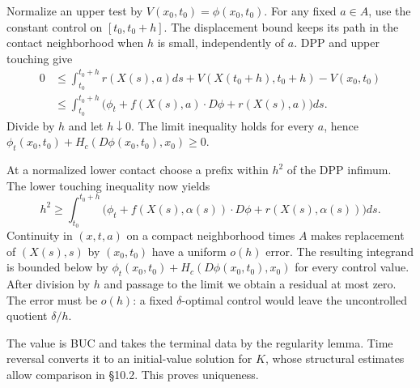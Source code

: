 \begin{expandedproof}
Normalize an upper test by $V(x_0,t_0)=\phi(x_0,t_0)$.
For any fixed $a\in A$, use the constant control on $[t_0,t_0+h]$.
The displacement bound keeps its path in the contact neighborhood when
$h$ is small, independently of $a$. DPP and upper touching give
\[
 \begin{split}
 0&\leq\int_{t_0}^{t_0+h}r(X(s),a)ds
              +V(X(t_0+h),t_0+h)-V(x_0,t_0)\\
 &\leq\int_{t_0}^{t_0+h}
       \bigl(\phi_t+f(X(s),a)\cdot D\phi+r(X(s),a)\bigr)ds.
 \end{split}
\]
Divide by $h$ and let $h\downarrow0$. The limit inequality holds for
every $a$, hence
$\phi_t(x_0,t_0)+H_c(D\phi(x_0,t_0),x_0)\geq0$.

At a normalized lower contact choose a prefix within $h^2$ of the
DPP infimum. The lower touching inequality now yields
\[
 h^2\geq\int_{t_0}^{t_0+h}
 \bigl(\phi_t+f(X(s),\alpha(s))\cdot D\phi+r(X(s),\alpha(s))\bigr)ds.
\]
Continuity in $(x,t,a)$ on a compact neighborhood times $A$ makes
replacement of $(X(s),s)$ by $(x_0,t_0)$ have a uniform $o(h)$ error.
The resulting integrand is bounded below by
$\phi_t(x_0,t_0)+H_c(D\phi(x_0,t_0),x_0)$ for every control value.
After division by $h$ and passage to the limit we obtain a residual
at most zero. The error must be $o(h)$: a fixed $\delta$-optimal control
would leave the uncontrolled quotient $\delta/h$.

The value is BUC and takes the terminal data by the regularity lemma.
Time reversal converts it to an initial-value solution for $K$, whose
structural estimates allow comparison in \S10.2. This proves uniqueness.
\end{expandedproof}
\Needspace{42mm}

\Needspace{70mm}
